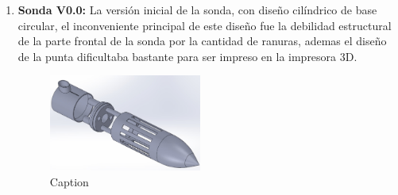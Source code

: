 \begin{appendices}
\begin{enumerate}
\item \textbf{Sonda V0.0:} La versión inicial de la sonda, con diseño cilíndrico de base circular, el inconveniente principal de este diseño fue la debilidad estructural de la parte frontal de la sonda por la cantidad de ranuras, ademas el diseño de la punta dificultaba bastante para ser impreso en la impresora 3D.
\begin{figure}[ht]
    \centering
    \includegraphics[width=50mm]{Imagenes/Sonda_v0.jpg}
    \caption{Caption}
    \label{fig:my_label}
\end{figure}


\end{enumerate}
\end{appendices}
